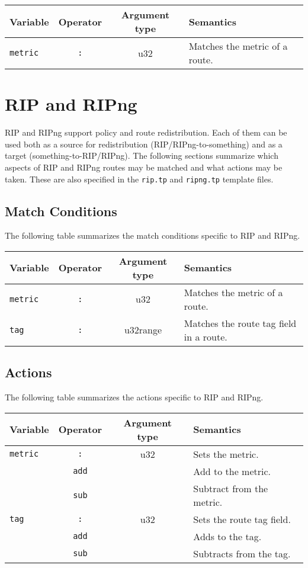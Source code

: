\begin{center}
\begin{tabular}{|l|c|c|p{7cm}|}
\hline
Variable & Operator & Argument type & Semantics \\
\hline
\hline
{\tt metric} & {\tt :} & u32 & Matches the metric of a route.\\
\hline
\end{tabular}
\end{center}

\section{RIP and RIPng}
RIP and RIPng support policy and route redistribution.  Each of
them can be used both as a source for redistribution
(RIP/RIPng-to-something) and as a target (something-to-RIP/RIPng). The
following sections summarize which aspects of 
RIP and RIPng routes may be matched and what actions may be taken. These
are also specified in the {\tt rip.tp} and {\tt ripng.tp} template files.

\subsection{Match Conditions}
The following table summarizes the match conditions specific to RIP and RIPng.

\begin{center}
\begin{tabular}{|l|c|c|p{7cm}|}
\hline
Variable & Operator & Argument type & Semantics \\
\hline
\hline
{\tt metric} & {\tt :} & u32 & Matches the metric of a route.\\

\hline
{\tt tag} & {\tt :} & u32range & Matches the route tag field in a route. \\
\hline
\end{tabular}
\end{center}

\subsection{Actions}
The following table summarizes the actions specific to RIP and RIPng.

\begin{center}
\begin{tabular}{|l|c|c|p{7cm}|}
\hline
Variable & Operator & Argument type & Semantics \\
\hline
\hline
{\tt metric} & {\tt :} & u32 & Sets the metric. \\
 & {\tt add} &  & Add to the metric. \\
 & {\tt sub} &  & Subtract from the metric. \\

\hline
{\tt tag} & {\tt :} & u32 & Sets the route tag field. \\
& {\tt add} & & Adds to the tag. \\
& {\tt sub} & & Subtracts from the tag. \\
\hline
\end{tabular}
\end{center}

